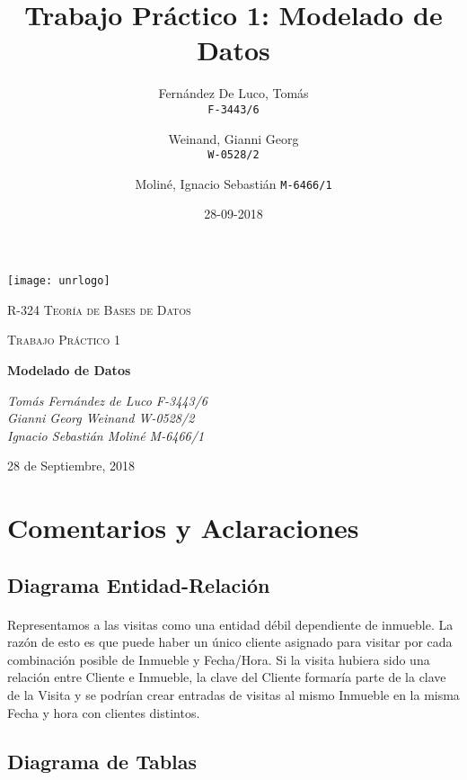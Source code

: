 \documentclass{article}
\title{Trabajo Pr\'actico 1: Modelado de Datos}
\date{28-09-2018}
\author{
	Fern\'andez De Luco, Tom\'as\\
	\texttt{F-3443/6}
	\and
	Weinand, Gianni Georg\\
	\texttt{W-0528/2}
	\and
	Molin\'e, Ignacio Sebasti\'an
	\texttt{M-6466/1}
}
\begin{document}
\begin{titlepage}
	\centering
	\texttt{[image: unrlogo]}\par\vspace{1cm}
	{\scshape\LARGE R-324 Teor\'ia de Bases de Datos \par}
	\vspace{1cm}
	{\scshape\Large Trabajo Pr\'actico 1\par}
	\vspace{1.5cm}
	{\huge\bfseries Modelado de Datos \par}
	\vspace{2cm}
	{\Large\itshape Tom\'as Fern\'andez de Luco F-3443/6 \\ Gianni Georg Weinand W-0528/2 \\ Ignacio Sebasti\'an Molin\'e M-6466/1 \par}
	\vfill

	{\large 28 de Septiembre, 2018 \par}
\end{titlepage}

\begin{comment}
\tableofcontents

\newpage
\end{comment}

\section{Comentarios y Aclaraciones}
\subsection{Diagrama Entidad-Relaci\'on}

\paragraph{}
Representamos a las visitas como una entidad d\'ebil dependiente de inmueble. La raz\'on de esto es que puede haber un \'unico cliente asignado para visitar por cada combinaci\'on posible de Inmueble y Fecha/Hora. Si la visita hubiera sido una relaci\'on entre Cliente e Inmueble, la clave del Cliente formar\'ia parte de la clave de la Visita y se podr\'ian crear entradas de visitas al mismo Inmueble en la misma Fecha y hora con clientes distintos.

\subsection{Diagrama de Tablas}
\end{document}
